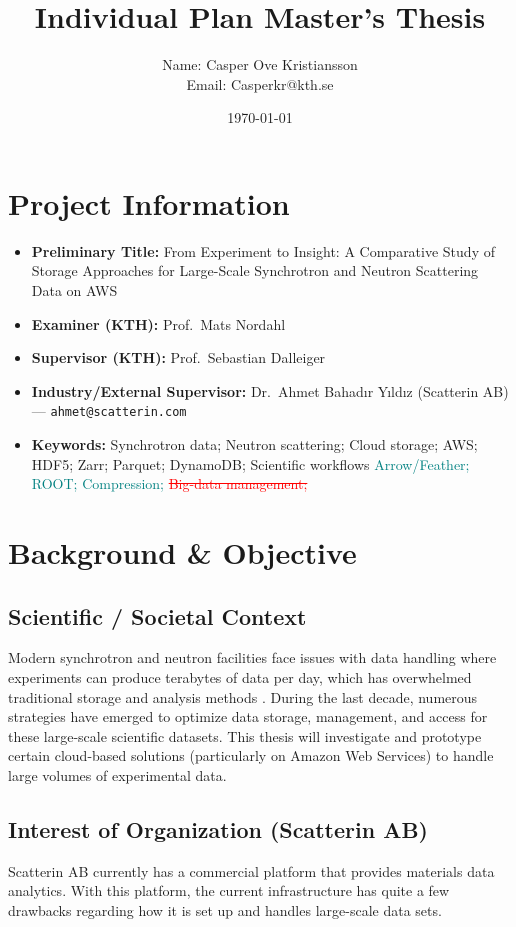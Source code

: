 \documentclass{article}
\title{Individual Plan Master's Thesis}
\author{Name: Casper Ove Kristiansson\\Email: Casperkr@kth.se}
\date{\today}
\begin{document}
\setlength\parindent{0pt}
\maketitle

\section{Project Information}
\begin{itemize}
  \item \textbf{Preliminary Title:} From Experiment to Insight: A Comparative Study of Storage Approaches for Large-Scale Synchrotron and Neutron Scattering Data on AWS
  \item \textbf{Examiner (KTH):} Prof.\ Mats Nordahl
  \item \textbf{Supervisor (KTH):} Prof.\ Sebastian Dalleiger
  \item \textbf{Industry/External Supervisor:} Dr.\ Ahmet Bahadır Yıldız (Scatterin AB) — \texttt{ahmet@scatterin.com}
  \item \textbf{Keywords:} Synchrotron data; Neutron scattering; Cloud storage; AWS; HDF5; Zarr; Parquet;  DynamoDB;  Scientific workflows \textcolor{teal}{Arrow/Feather; ROOT; Compression;} \textcolor{red}{\sout{Big-data management;}}
\end{itemize}




\section{Background \& Objective}
\subsection{Scientific / Societal Context}
Modern synchrotron and neutron facilities face issues with data handling where experiments can produce terabytes of data per day, which has overwhelmed traditional storage and analysis methods \cite{wang2018synchrotron}. During the last decade, numerous strategies have emerged to optimize data storage, management, and access for these large-scale scientific datasets. This thesis will investigate and prototype certain cloud-based solutions (particularly on Amazon Web Services) to handle large volumes of experimental data.

\subsection{Interest of Organization (Scatterin AB)}
Scatterin AB currently has a commercial platform that provides materials data analytics. With this platform, the current infrastructure has quite a few drawbacks regarding how it is set up and handles large-scale data sets.
\end{document}
